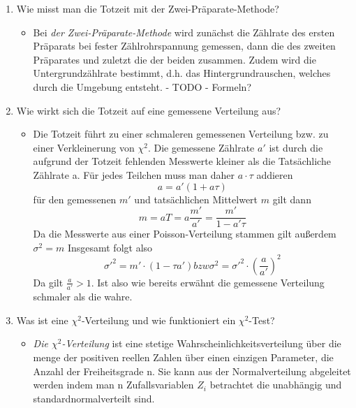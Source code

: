 \documentclass{article}
\begin{document}
        \begin{enumerate}
            \item Wie misst man die Totzeit mit der Zwei-Präparate-Methode?
                \begin{itemize}
                    \item Bei \emph{der Zwei-Präparate-Methode} wird zunächst die Zählrate des ersten Präparats bei fester Zählrohrspannung gemessen, dann die des zweiten Präparates
                    und zuletzt die der beiden zusammen. Zudem wird die Untergrundzählrate bestimmt, d.h. das Hintergrundrauschen, welches durch die Umgebung entsteht.
                    - TODO - Formeln?
                \end{itemize} 
            \item Wie wirkt sich die Totzeit auf eine gemessene Verteilung aus?
                \begin{itemize}
                    \item Die Totzeit führt zu einer schmaleren gemessenen Verteilung bzw. zu einer Verkleinerung von $\chi^2$. \newline
                    Die gemessene Zählrate $a'$ ist durch die aufgrund der Totzeit fehlenden Messwerte kleiner als die Tatsächliche Zählrate a.
                    Für jedes Teilchen muss man daher $a\cdot\tau$ addieren
                    $$a=a'(1+a\tau)$$
                    für den gemessenen $m'$ und tatsächlichen Mittelwert $m$ gilt dann
                    $$m = aT = a\frac{m'}{a'}=\frac{m'}{1-a'\tau}$$
                    Da die Messwerte aus einer Poisson-Verteilung stammen gilt außerdem $\sigma^2=m$
                    Insgesamt folgt also
                    $$\sigma'^2 = m' \cdot (1-\tau a') bzw \sigma^2=\sigma'^2 \cdot (\frac{a}{a'})^2$$
                    Da gilt $\frac{a}{a'} > 1$. Ist also wie bereits erwähnt die gemessene Verteilung schmaler als die wahre.
                \end{itemize} 
            \item Was ist eine $\chi^2$-Verteilung und wie funktioniert ein $\chi^2$-Test?
                \begin{itemize}
                    \item \emph{Die $\chi^2$-Verteilung} ist eine stetige Wahrscheinlichkeitsverteilung über die menge der positiven reellen Zahlen über einen einzigen Parameter,
                    die Anzahl der Freiheitsgrade n. Sie kann aus der Normalverteilung abgeleitet werden indem man n Zufallsvariablen $Z_i$ betrachtet die unabhängig und standardnormalverteilt sind.

\end{itemize}
\end{enumerate}
\end{document}

